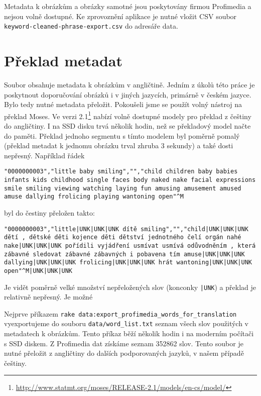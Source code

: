 Metadata k obrázkům a obrázky samotné jsou poskytovány firmou Profimedia a nejsou volně dostupné. Ke zprovoznění aplikace je nutné vložit CSV soubor \lstinline{keyword-cleaned-phrase-export.csv} do adresáře data.

\section{Překlad metadat}
Soubor obsahuje metadata k obrázkům v angličtině. Jedním z úkolů této práce je poskytnout doporučování obrázků i v jiných jazycích, primárně v českém jazyce. Bylo tedy nutné metadata přeložit. Pokoušeli jsme se použít volný nástroj na překlad Moses. Ve verzi 2.1\footnote{\url{http://www.statmt.org/moses/RELEASE-2.1/models/en-cs/model/}} nabízí volně dostupné modely pro překlad z češtiny do angličtiny. I na SSD disku trvá několik hodin, než se překladový model načte do paměti. Překlad jednoho segmentu s tímto modelem byl poměrně pomalý (překlad metadat k jednomu obrázku trval zhruba 3 sekundy) a také dosti nepřesný. Například řádek

\begin{lstlisting}
"0000000003","little baby smiling","","child children baby babies infants kids childhood single faces body naked nake facial expressions smile smiling viewing watching laying fun amusing amusement amused amuse dallying frolicing playing wantoning open"^M
\end{lstlisting}

byl do čestiny přeložen takto:

\begin{lstlisting}
"0000000003","little|UNK|UNK|UNK dítě smiling","","child|UNK|UNK|UNK dětí , dětské děti kojence děti dětství jednotného čelí orgán nahé nake|UNK|UNK|UNK pořídili vyjádření usmívat usmívá odůvodněním , která zábavné sledovat zábavné zábavných i pobavena tím amuse|UNK|UNK|UNK dallying|UNK|UNK|UNK frolicing|UNK|UNK|UNK hrát wantoning|UNK|UNK|UNK open"^M|UNK|UNK|UNK
\end{lstlisting}

Je vidět poměrně velké množství nepřeložených slov (konconky \lstinline{|UNK}) a překlad je relativně nepřesný. Je možné 

Nejprve příkazem \lstinline{rake data:export_profimedia_words_for_translation} vyexportujeme do souboru \lstinline{data/word_list.txt} seznam všech slov použitých v metadatech k obrázkům. Tento příkaz běží několik hodin i na moderním počítači s SSD diskem. Z Profimedia dat získáme seznam 352862 slov. Tento soubor je nutné přeložit z angličtiny do dalších podporovaných jazyků, v našem případě češtiny.

